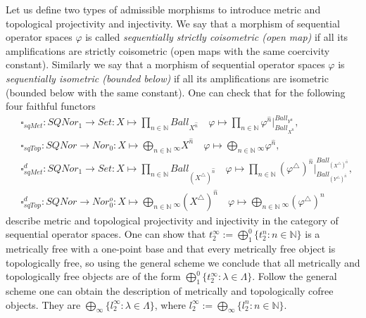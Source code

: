 \documentclass[a0b,landscape]{a0poster}
\begin{document}
\begin{multicols}{4}
Let us define two types of admissible morphisms to introduce metric and
topological projectivity and injectivity. We say that a morphism of sequential
operator spaces $\varphi$ is called \textit{sequentially strictly coisometric
(open map)} if all its amplifications are strictly coisometric (open maps with
the same coercivity constant). Similarly we say that a morphism of sequential
operator spaces $\varphi$ is \textit{sequentially isometric (bounded below)} if
all its amplifications are isometric (bounded below with the same constant). One
can check that for the following four faithful functors
$$
\begin{aligned}
&\square_{sqMet}
:SQNor_1 \to Set
:X\mapsto\prod_{n \in \mathbb{N}} Ball_{X^{\widehat{n}}}\quad
\varphi\mapsto \prod_{n\in\mathbb{N}} 
    \varphi^{\widehat{n}}|_{Ball_{X^{\widehat{n}}}}^{Ball_{Y^{\widehat{n}}}},\\
&\square_{sqTop}
:SQNor \to Nor_0
:X \mapsto \bigoplus_{n \in \mathbb{N}}{}_\infty X^{\widehat{n}}  \quad
\varphi\mapsto\bigoplus_{n\in\mathbb{N}}{}_\infty \varphi^{\widehat{n}},\\
&\square_{sqMet}^d
:SQNor_1 \to Set
:X\mapsto\prod_{n \in \mathbb{N}} Ball_{{(X^\triangle)}^{\widehat{n}}}\quad
\varphi\mapsto \prod_{n\in\mathbb{N}} {(\varphi^\triangle)}^{\widehat{n}}|_{
    Ball_{{(Y^\triangle)}^{\widehat{n}}}
}^{
    Ball_{{(X^\triangle)}^{\widehat{n}}}
},\\
&\square_{sqTop}^d
:SQNor \to Nor_0^o
:X\mapsto \bigoplus_{n\in\mathbb{N}}{}_\infty {(X^\triangle)}^{\widehat{n}}\quad
\varphi\mapsto\bigoplus_{n\in\mathbb{N}}{}_\infty {(
    \varphi^\triangle
)}^{\widehat{n}}
\end{aligned}
$$
describe metric and topological projectivity and injectivity in the category of
sequential operator spaces. One can show that $t_2^{\infty} := \bigoplus_1^0
\{t_2^n: n \in \mathbb{N}\}$ is a metrically free with a one-point base and that
every metrically free object is topologically free, so using the general scheme
we conclude that all metrically and topologically free objects are of the form
$\bigoplus_1^0\{t_2^\infty: \lambda \in \Lambda \}$. Follow the general scheme
one can obtain the description of metrically and topologically cofree objects.
They are $\bigoplus_\infty \{l_2^\infty: \lambda \in \Lambda \}$, where
$l_2^{\infty} := \bigoplus_\infty \{l_2^n: n \in \mathbb{N}\}$.












\end{multicols}
\end{document}
